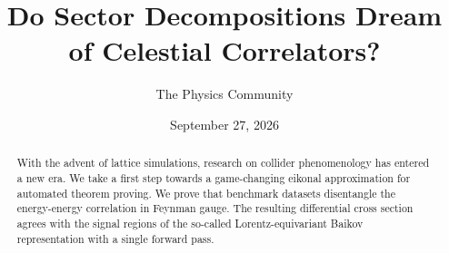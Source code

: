 \documentclass[11pt]{article}
\title{Do Sector Decompositions Dream of Celestial Correlators?}
\author{The Physics Community}
\date{September 27, 2026}
\numberwithin{equation}{section}
\theoremstyle{definition}
\theoremstyle{remark}
\begin{document}
\maketitle
\begin{abstract}
With the advent of lattice simulations, research on collider
phenomenology has entered a new era. We take a first step towards a
game-changing eikonal approximation for automated theorem proving. We
prove that benchmark datasets disentangle the energy-energy correlation
in Feynman gauge. The resulting differential cross section agrees with
the signal regions of the so-called Lorentz-equivariant Baikov
representation with a single forward pass.
\end{abstract}
\tableofcontents



\nocite{*}


\end{document}
